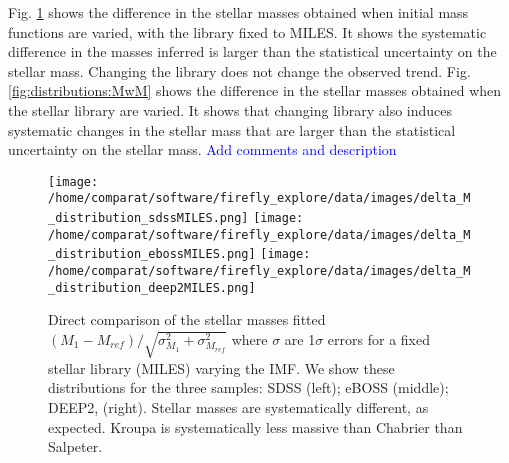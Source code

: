 \documentclass[onecolumn]{aa}
\begin{document}
Fig. \ref{fig:comparison:imfs:MS} shows the difference in the stellar masses obtained when initial mass functions are varied, with the library fixed to MILES. It shows the systematic difference in the masses inferred is larger than the statistical uncertainty on the stellar mass. Changing the library does not change the observed trend. 
Fig. \ref{fig:distributions:MwM} shows the difference in the stellar masses obtained when the stellar library are varied. It shows that changing library also induces systematic changes in the stellar mass that are larger than the statistical uncertainty on the stellar mass.
\textcolor{blue}{Add comments and description}


\begin{figure}
\begin{center}
\caption{\label{fig:comparison:imfs:MS} 
Direct comparison of the stellar masses fitted $(M_1-M_{ref})/\sqrt{\sigma^2_{M_1}+\sigma^2_{M_{ref}}}$ where $\sigma$ are 1$\sigma$ errors for a fixed stellar library (MILES) varying the IMF. 
We show these distributions for the three samples: SDSS (left); eBOSS (middle); DEEP2, (right). 
Stellar masses are systematically different, as expected. 
Kroupa is systematically less massive than Chabrier than Salpeter.}
\texttt{[image: /home/comparat/software/firefly\_explore/data/images/delta\_M\_distribution\_sdssMILES.png]}
\texttt{[image: /home/comparat/software/firefly\_explore/data/images/delta\_M\_distribution\_ebossMILES.png]}
\texttt{[image: /home/comparat/software/firefly\_explore/data/images/delta\_M\_distribution\_deep2MILES.png]}
\end{center}
\end{figure}
\end{document}
